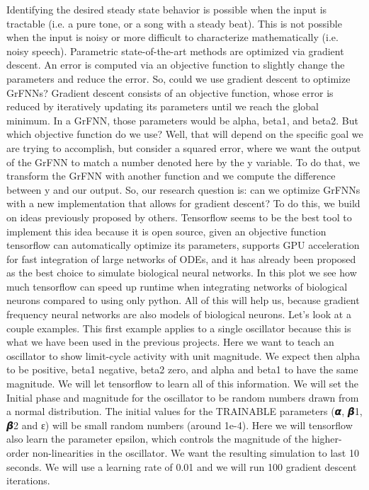 \documentclass{report}
\begin{document}
Identifying the desired steady state behavior is possible when the input is tractable (i.e. a pure tone, or a song with a steady beat). This is not possible when the input is noisy or more difficult to characterize mathematically (i.e. noisy speech). Parametric state-of-the-art methods are optimized via gradient descent. An error is computed via an objective function to slightly change the parameters and reduce the error. So, could we use gradient descent to optimize GrFNNs?
Gradient descent consists of an objective function, whose error is reduced by iteratively updating its parameters until we reach the global minimum. In a GrFNN, those parameters would be alpha, beta1, and beta2. But which objective function do we use? Well, that will depend on the specific goal we are trying to accomplish, but consider a squared error, where we want the output of the GrFNN to match a number denoted here by the y variable. To do that, we transform the GrFNN with another function and we compute the difference between y and our output. 
So, our research question is: can we optimize GrFNNs with a new implementation that allows for gradient descent? 
To do this, we build on ideas previously proposed by others. Tensorflow seems to be the best tool to implement this idea because it is open source, given an objective function tensorflow can automatically optimize its parameters, supports GPU acceleration for fast integration of large networks of ODEs, and it has already been proposed as the best choice to simulate biological neural networks. In this plot we see how much tensorflow can speed up runtime when integrating networks of biological neurons compared to using only python. All of this will help us, because gradient frequency neural networks are also models of biological neurons. 
Let’s look at a couple examples. This first example applies to a single oscillator because this is what we have been used in the previous projects.   Here we want to teach an oscillator to show limit-cycle activity with unit magnitude. We expect then alpha to be positive, beta1 negative, beta2 zero, and alpha and beta1 to have the same magnitude. We will let tensorflow to learn all of this information. We will set the Initial phase and magnitude for the oscillator to be random numbers drawn from a normal distribution. The initial values for the TRAINABLE parameters (𝞪, 𝞫1,  𝞫2 and ε) will be small random numbers (around 1e-4). Here we will tensorflow also learn the parameter epsilon, which controls the magnitude of the higher-order non-linearities in the oscillator. We want the resulting simulation to last 10 seconds. We will use a learning rate of 0.01 and we will run 100 gradient descent iterations.
\end{document}
